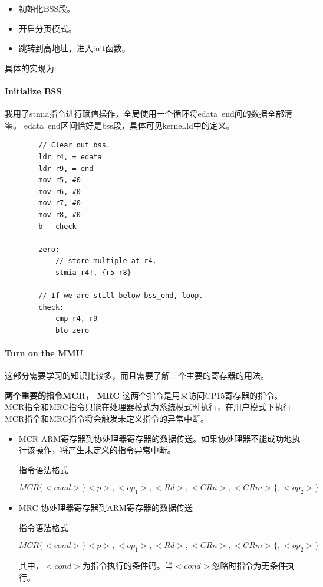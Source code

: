 \documentclass[11pt,a4paper]{article}
\begin{document}
\begin{CJK}{UTF8}{gkai}
		\begin{itemize}
			\item 初始化BSS段。
			\item 开启分页模式。
			\item 跳转到高地址，进入init函数。
		\end{itemize}
	
		具体的实现为:
		
		\paragraph{Initialize BSS}
		
		我用了stmia指令进行赋值操作，全局使用一个循环将edata~end间的数据全部清零。
		edata~end区间恰好是bss段，具体可见kernel.ld中的定义。
		\begin{lstlisting}
		// Clear out bss.
		ldr r4, = edata
		ldr r9, = end
		mov r5, #0
		mov r6, #0
		mov r7, #0
		mov r8, #0
		b	check
		
		zero:
			// store multiple at r4.
			stmia r4!, {r5-r8}
		
		// If we are still below bss_end, loop.
		check:
			cmp r4, r9
			blo zero
		\end{lstlisting}
		
		\paragraph{Turn on the MMU}
		这部分需要学习的知识比较多，而且需要了解三个主要的寄存器的用法。
		
		\textbf{两个重要的指令MCR， MRC}
		这两个指令是用来访问CP15寄存器的指令。MCR指令和MRC指令只能在处理器模式为系统模式时执行，在用户模式下执行MCR指令和MRC指令将会触发未定义指令的异常中断。
		
		\begin{itemize}
			\item MCR   ARM寄存器到协处理器寄存器的数据传送。如果协处理器不能成功地执行该操作，将产生未定义的指令异常中断。
			
			指令语法格式
			
			$$MCR\{<cond>\} <p>,<op_1>,<Rd>,<CRn>,<CRm>\{,<op_2>\}  $$
			
			\item MRC   协处理器寄存器到ARM寄存器的数据传送
			
			指令语法格式
			
			$$ MCR\{<cond>\} <p>,<op_1>,<Rd>,<CRn>,<CRm>\{,<op_2>\}$$
			
			其中，$<cond>$为指令执行的条件码。当$<cond>$忽略时指令为无条件执行。
			

\end{itemize}
\end{CJK}
\end{document}
